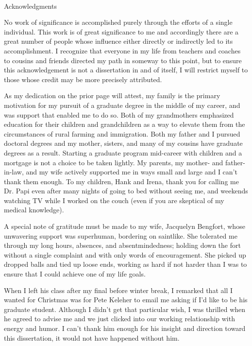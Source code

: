 
\renewcommand{\baselinestretch}{2}
\small\normalsize
\hbox{\ }

\vspace{-.65in}

\begin{center}
\large{Acknowledgments}
\end{center}

\vspace{1ex}

No work of significance is accomplished purely through the efforts of a single individual. This work is of great significance to me and accordingly there are a great number of people whose influence either directly or indirectly led to its accomplishment. I recognize that everyone in my life from teachers and coaches to cousins and friends directed my path in someway to this point, but to ensure this acknowledgement is not a dissertation in and of itself, I will restrict myself to those whose credit may be more precisely attributed.

As my dedication on the prior page will attest, my family is the primary motivation for my pursuit of a graduate degree in the middle of my career, and was support that enabled me to do so. Both of my grandmothers emphasized education for their children and grandchildren as a way to elevate them from the circumstances of rural farming and immigration. Both my father and I pursued doctoral degrees and my mother, sisters, and many of my cousins have graduate degrees as a result. Starting a graduate program mid-career with children and a mortgage is not a choice to be taken lightly. My parents, my mother- and father-in-law, and my wife actively supported me in ways small and large and I can't thank them enough. To my children, Hank and Irena, thank you for calling me Dr. Papi even after many nights of going to bed without seeing me, and weekends watching TV while I worked on the couch (even if you are skeptical of my medical knowledge).

A special note of gratitude must be made to my wife, Jacquelyn Bengfort, whose unwavering support was superhuman, bordering on saintlike. She tolerated me through my long hours, absences, and absentmindedness; holding down the fort without a single complaint and with only words of encouragement. She picked up dropped balls and tied up loose ends, working as hard if not harder than I was to ensure that I could achieve one of my life goals.

When I left his class after my final before winter break, I remarked that all I wanted for Christmas was for Pete Keleher to email me asking if I'd like to be his graduate student. Although I didn't get that particular wish, I was thrilled when he agreed to advise me and we just clicked into our working relationship with energy and humor. I can't thank him enough for his insight and direction toward this dissertation, it would not have happened without him.

